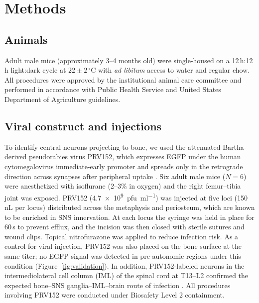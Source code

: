 \documentclass[11pt]{article}
\begin{document}
\section{Methods}\label{sec:methods}

\subsection{Animals}
Adult male mice (approximately 3--4 months old) were single-housed on a 12\,h:12\,h light:dark cycle at $22\pm2$\,$^\circ$C with \emph{ad libitum} access to water and regular chow. All procedures were approved by the institutional animal care committee and performed in accordance with Public Health Service and United States Department of Agriculture guidelines.

\subsection{Viral construct and injections}
To identify central neurons projecting to bone, we used the attenuated Bartha-derived pseudorabies virus PRV152, which expresses EGFP under the human cytomegalovirus immediate-early promoter and spreads only in the retrograde direction across synapses after peripheral uptake \citep{card2001transneuronal,ekstrand2008alpha,card1995influence}. Six adult male mice ($N=6$) were anesthetized with isoflurane (2--3\% in oxygen) and the right femur--tibia joint was exposed. PRV152 (\SI{4.7e9}{pfu\per\milli\litre}) was injected at five loci (150\,nL per locus) distributed across the metaphysis and periosteum, which are known to be enriched in SNS innervation. At each locus the syringe was held in place for 60\,s to prevent efflux, and the incision was then closed with sterile sutures and wound clips. Topical nitrofurazone was applied to reduce infection risk. As a control for viral injection, PRV152 was also placed on the bone surface at the same titer; no EGFP signal was detected in pre-autonomic regions under this condition (Figure~\ref{fig:validation}). In addition, PRV152-labeled neurons in the intermediolateral cell column (IML) of the spinal cord at T13--L2 confirmed the expected bone--SNS ganglia--IML--brain route of infection \citep{bamshad1998central,ryu2014short}. All procedures involving PRV152 were conducted under Biosafety Level 2 containment.
\end{document}
